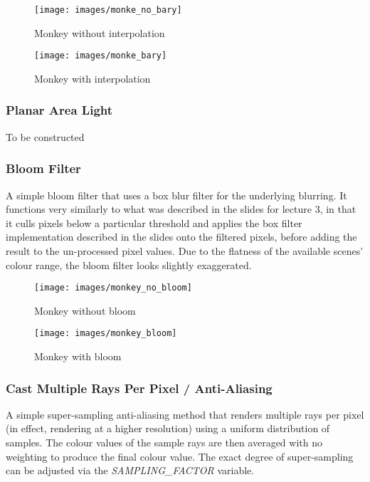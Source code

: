 \documentclass{article}
\begin{document}
    \begin{figure}[!htb]
        \texttt{[image: images/monke\_no\_bary]}
        \caption*{Monkey without interpolation}
      \endminipage\hfill
        \texttt{[image: images/monke\_bary]}
        \caption*{Monkey with interpolation}
      \endminipage
  \end{figure}

    \subsubsection{Planar Area Light}
    To be constructed

    \subsubsection{Bloom Filter}
    A simple bloom filter that uses a box blur filter for the underlying blurring. It functions very similarly 
    to what was described in the slides for lecture 3, in that it culls pixels below a particular threshold 
    and applies the box filter implementation described in the slides onto the filtered pixels, before adding 
    the result to the un-processed pixel values. Due to the flatness of the available scenes' colour range,
    the bloom filter looks slightly exaggerated.

    \begin{figure}[!htb]
          \texttt{[image: images/monkey\_no\_bloom]}
          \caption*{Monkey without bloom}
        \endminipage\hfill
          \texttt{[image: images/monkey\_bloom]}
          \caption*{Monkey with bloom}
        \endminipage
    \end{figure}
    
    \subsubsection{Cast Multiple Rays Per Pixel / Anti-Aliasing}
    A simple super-sampling anti-aliasing method that renders multiple rays per pixel (in effect, rendering 
    at a higher resolution) using a uniform distribution of samples. The colour values of the sample rays are 
    then averaged with no weighting to produce the final colour value. The exact degree of super-sampling can 
    be adjusted via the \emph{SAMPLING\_FACTOR} variable.
    
\end{document}
